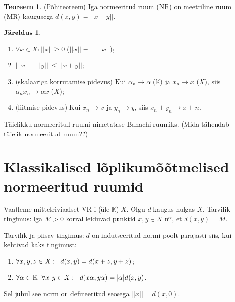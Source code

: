 \documentclass{article}[12pt]
\newcommand{\h}{\hspace{0.2cm}}
\newcommand{\K}{\mathbb{K}}
\newcommand{\norm}[1]{||#1||}
\theoremstyle{definition}
\theoremstyle{definition}
\newtheorem{theorem}{Teoreem}[section]
\theoremstyle{definition}
\newtheorem{jareldus}{Järeldus}[section]
\begin{document}
\begin{theorem}
	(Põhiteoreem) Iga normeeritud ruum (NR) on meetriline ruum (MR) kaugusega $d(x,y) = ||x-y||$.
\end{theorem}

\begin{jareldus}
	\begin{enumerate}
		\item $\forall x\in X: \norm{x} \geq 0$ ($\norm{x} = \norm{-x}$);
		\item $\bigg\lvert \norm{x} - \norm{y} \bigg\rvert \leq \norm{x+y}$;
		\item (skalaariga korrutamise pidevus) Kui $\alpha_n\rightarrow \alpha$ ($\K$) ja $x_n\rightarrow x$ ($X$), siis $\alpha_n x_n\rightarrow \alpha x$ ($X$);
		\item (liitmise pidevus) Kui $x_n\rightarrow x$ ja $y_n\rightarrow y$, siis $x_n+y_n \rightarrow x+n$.
	\end{enumerate}
\end{jareldus}

Täielikku normeeritud ruumi nimetatase Banachi ruumiks. (Mida tähendab täielik normeeritud ruum??)

\section{Klassikalised lõplikumõõtmelised normeeritud ruumid}

Vaatleme mittetriviaalset VR-i (üle $\K$) $X$. Olgu $d$ kaugus hulgas $X$.
Tarvilik tingimus: iga $M>0$ korral leiduvad punktid $x,y\in X$ nii, et $d(x,y) = M$.

Tarvilik ja piisav tingimus: $d$ on indutseeritud normi poolt parajasti siis, kui kehtivad kaks tingimust:
\begin{enumerate}
	\item $\forall x,y,z\in X :\h d(x,y) = d(x+z,y+z)$;
	\item $\forall \alpha\in \K \h\forall x,y\in X: \h d(x\alpha,y\alpha) = |\alpha|d(x,y)$.
\end{enumerate}
Sel juhul see norm on defineeritud seosega $\norm{x} = d(x,0)$.
\end{document}

